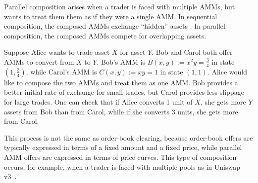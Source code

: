 
Parallel composition arises when a trader is faced with multiple AMMs,
but wants to treat them them as if they were a single AMM.
In sequential composition,
the composed AMMs exchange ``hidden'' assets .
In parallel composition,
the composed AMMs compete for overlapping assets.

Suppose Alice wants to trade asset $X$ for asset $Y$.
Bob and Carol both offer AMMs to convert from $X$ to $Y$.
Bob's AMM is $B(x,y):=x^2y=\frac{3}{4}$ in state $(1,\frac{3}{4})$,
while Carol's AMM is $C(x,y):=x y = 1$ in state $(1,1)$.
Alice would like to compose the two AMMs and treat them as one AMM.
Bob provides a better initial rate of exchange for small trades,
but Carol provides less slippage for large trades.
One can check that if Alice converts 1 unit of $X$,
she gets more $Y$ assets from Bob than from Carol,
while if she converts 3 units,
she gets more from Carol.

This process is not the same as order-book clearing,
because order-book offers are typically expressed in terms of a fixed amount and a fixed price,
while parallel AMM offers are expressed in terms of price curves.
This type of composition occurs, for example,
when a trader is faced with multiple pools as in Uniswap v3~\cite{uniswapv3}.

